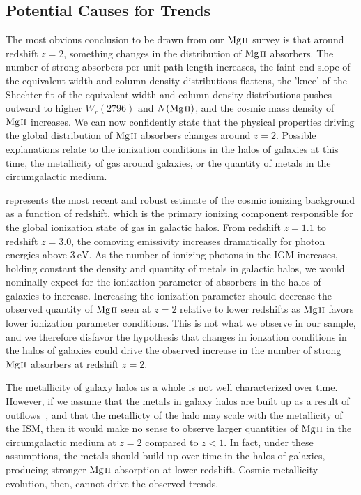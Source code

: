 \documentclass[iop,apj,numberedappendix,appendixfloats,twocolappendix]{emulateapj}
\begin{document}
\subsection{Potential Causes for Trends}
\label{trendcauses}

The most obvious conclusion to be drawn from our ${\hbox{{\rm Mg}\kern 0.1em{\sc ii}}}$ survey is that around redshift $z = 2$, something changes in the distribution of ${\hbox{{\rm Mg}\kern 0.1em{\sc ii}}}$ absorbers. The number of strong absorbers per unit path length increases, the faint end slope of the equivalent width and column density distributions flattens, the 'knee' of the Shechter fit of the equivalent width and column density distributions pushes outward to higher $W_r(2796)$ and $N(\hbox{{\rm Mg}\kern 0.1em{\sc ii}})$, and the cosmic mass density of ${\hbox{{\rm Mg}\kern 0.1em{\sc ii}}}$ increases. We can now confidently state that the physical properties driving the global distribution of ${\hbox{{\rm Mg}\kern 0.1em{\sc ii}}}$ absorbers changes around $z = 2$. Possible explanations relate to the ionization conditions in the halos of galaxies at this time, the metallicity of gas around galaxies, or the quantity of metals in the circumgalactic medium.

\cite{Haardt2012} represents the most recent and robust estimate of the cosmic ionizing background as a function of redshift, which is the primary ionizing component responsible for the global ionization state of gas in galactic halos. From redshift $z = 1.1$ to redshift $z = 3.0$, the comoving emissivity increases dramatically for photon energies above $3~\mathrm{eV}$. As the number of ionizing photons in the IGM increases, holding constant the density and quantity of metals in galactic halos, we would nominally expect for the ionization parameter of absorbers in the halos of galaxies to increase. Increasing the ionization parameter should decrease the observed quantity of ${\hbox{{\rm Mg}\kern 0.1em{\sc ii}}}$ seen at $z = 2$ relative to lower redshifts as ${\hbox{{\rm Mg}\kern 0.1em{\sc ii}}}$ favors lower ionization parameter conditions. This is not what we observe in our sample, and we therefore disfavor the hypothesis that changes in ionzation conditions in the halos of galaxies could drive the observed increase in the number of strong ${\hbox{{\rm Mg}\kern 0.1em{\sc ii}}}$ absorbers at redshift $z = 2$. 

The metallicity of galaxy halos as a whole is not well characterized over time. However, if we assume that the metals in galaxy halos are built up as a result of outflows~\citep{Quiret2016}, and that the metallicty of the halo may scale with the metallicity of the ISM, then it would make no sense to observe larger quantities of ${\hbox{{\rm Mg}\kern 0.1em{\sc ii}}}$ in the circumgalactic medium at $z = 2$ compared to $z < 1$. In fact, under these assumptions, the metals should build up over time in the halos of galaxies, producing stronger ${\hbox{{\rm Mg}\kern 0.1em{\sc ii}}}$ absorption at lower redshift. Cosmic metallicity evolution, then, cannot drive the observed trends.
\end{document}
